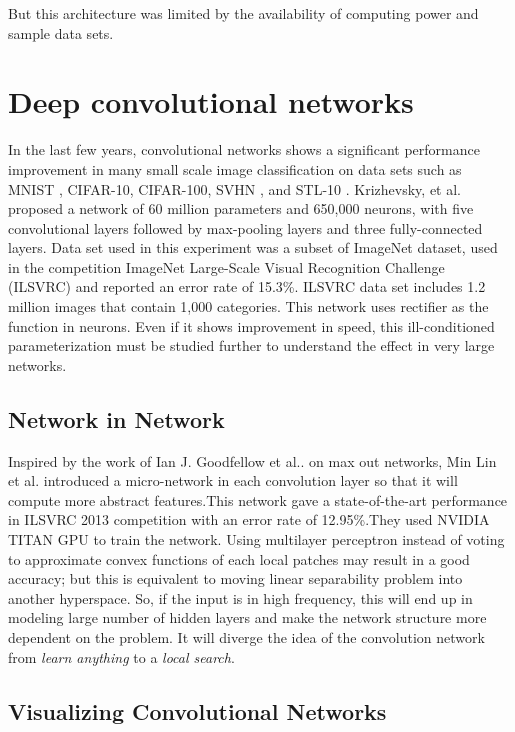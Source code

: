 \documentclass[a4paper]{article}
\begin{document}
But this architecture was limited by the availability of computing power and  sample data sets. 

\section {Deep convolutional networks}
In the last few years, convolutional networks shows a significant performance improvement in many small scale image classification on data sets  such as MNIST \cite{Ciresan:2012g}, CIFAR-10, CIFAR-100, SVHN \cite{lee2014deeply}, and STL-10 \cite{deepfwd}. Krizhevsky, et al. \cite{Krizhevsky2012a} proposed a network  of 60 million parameters and 650,000 neurons, with five convolutional layers followed by max-pooling layers and three fully-connected layers. Data set used in this experiment was a subset of ImageNet dataset, used in the competition ImageNet Large-Scale Visual Recognition Challenge (ILSVRC) \cite{imagenet} and reported an error rate of 15.3\%. ILSVRC data set includes 1.2 million images that contain 1,000 categories. This network uses rectifier  as the function in neurons.  Even if it shows improvement in speed, this  ill-conditioned parameterization must be studied further to understand the effect in very large networks.



\subsection{Network in Network }
Inspired by the work of Ian J. Goodfellow et al..\cite{Goodfellow2013} on max out networks,  Min Lin et al. \cite{Lin2013} introduced a micro-network in each convolution layer so that it will compute more abstract features.This network gave a state-of-the-art performance in  ILSVRC 2013 competition with an error rate of 12.95\%.They used NVIDIA TITAN GPU to train the network. Using multilayer perceptron instead of voting to approximate convex functions of each  local patches may result in a good accuracy; but this is equivalent to moving linear separability problem into another hyperspace. So, if the input is in high frequency, this will end up in modeling large number of hidden layers and make the network structure more dependent on the problem. It will diverge the idea of the convolution network from \emph{learn anything} to a \emph{local search}.

\subsection{Visualizing Convolutional Networks}
\end{document}
